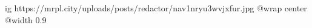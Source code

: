  
 
 
 
 

\ifcmt
  ig https://mrpl.city/uploads/posts/redactor/nav1nryu3wvjxfur.jpg
  @wrap center
  @width 0.9
\fi
